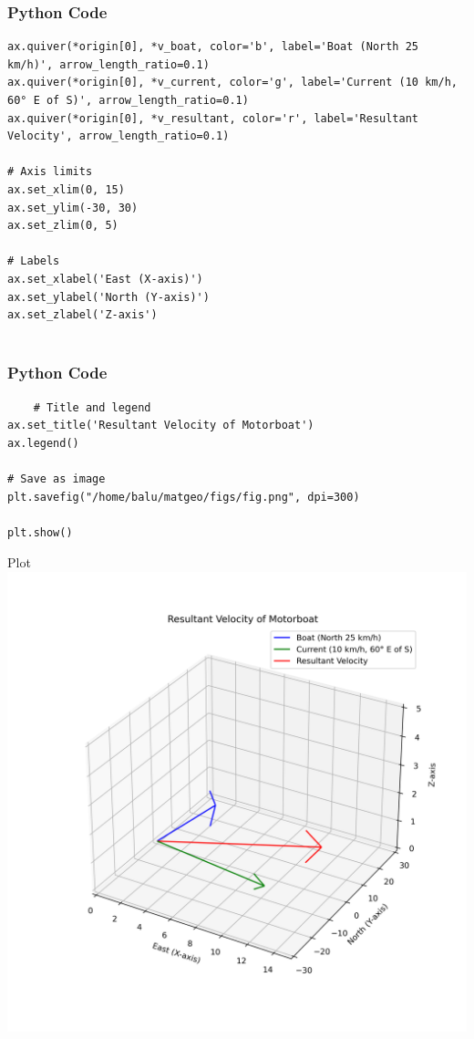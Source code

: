 \documentclass{beamer}
\begin{document}
\begin{frame}[fragile]
    \frametitle{Python Code}
    \begin{lstlisting}
ax.quiver(*origin[0], *v_boat, color='b', label='Boat (North 25 km/h)', arrow_length_ratio=0.1)
ax.quiver(*origin[0], *v_current, color='g', label='Current (10 km/h, 60° E of S)', arrow_length_ratio=0.1)
ax.quiver(*origin[0], *v_resultant, color='r', label='Resultant Velocity', arrow_length_ratio=0.1)

# Axis limits
ax.set_xlim(0, 15)
ax.set_ylim(-30, 30)
ax.set_zlim(0, 5)

# Labels
ax.set_xlabel('East (X-axis)')
ax.set_ylabel('North (Y-axis)')
ax.set_zlabel('Z-axis')


    \end{lstlisting}
\end{frame}
\begin{frame}[fragile]
    \frametitle{Python Code}
    \begin{lstlisting}
    # Title and legend
ax.set_title('Resultant Velocity of Motorboat')
ax.legend()

# Save as image
plt.savefig("/home/balu/matgeo/figs/fig.png", dpi=300)

plt.show()
 \end{lstlisting}
\end{frame}
\begin{frame}{Plot}
    \centering
    \includegraphics[width=\columnwidth, height=0.8\textheight, keepaspectratio]{figs/fig.png}     
\end{frame}
\end{document}
